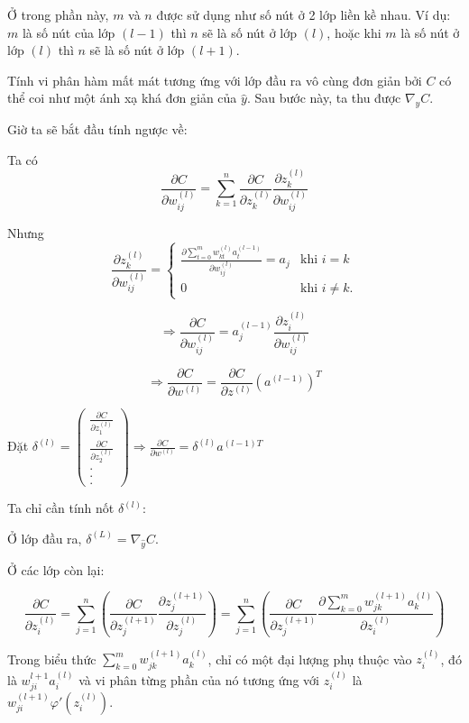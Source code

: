 \documentclass{article}
\begin{document}
Ở trong phần này, $m$ và $n$ được sử dụng như số nút ở 2 lớp liền kề nhau. Ví dụ: $m$ là số nút của lớp $(l - 1)$ thì $n$ sẽ là số nút ở lớp $(l)$, hoặc khi $m$ là số nút ở lớp $(l)$ thì $n$ sẽ là số nút ở lớp $(l + 1)$.

Tính vi phân hàm mất mát tương ứng với lớp đầu ra vô cùng đơn giản bởi $C$ có thể coi như một ánh xạ khá đơn giản của $\hat{y}$. Sau bước này, ta thu được $\nabla_{\hat{y}} C$.

Giờ ta sẽ bắt đầu tính ngược về:

Ta có 
\[\frac{\partial{C}}{\partial{w_{ij}^{(l)}}} = \sum_{k=1}^{n}\frac{\partial{C}}{\partial{z^{(l)}_{k}}} \frac{\partial{z^{(l)}_{k}}}{\partial{w_{ij}^{(l)}}}\]

Nhưng 
\[\frac{\partial{z^{(l)}_{k}}}{\partial{w_{ij}^{(l)}}} =
\begin{cases}
\frac{\partial{\sum_{t=0}^{m}w_{kt}^{(l)}a^{(l-1)}_{t}}}{\partial{w_{ij}^{(l)}}} = a_{j} & \text{khi } i = k \\ 0 & \text{khi } i \neq k.
\end{cases}
\]

\[\Rightarrow \frac{\partial{C}}{\partial{w_{ij}^{(l)}}} = a_{j}^{(l-1)} \frac{\partial{z^{(l)}_{i}}}{\partial{w_{ij}^{(l)}}}\]

\[\Rightarrow \frac{\partial{C}}{\partial{w^{(l)}}} = \frac{\partial{C}}{\partial{z^{(l)}}}(a^{(l-1)})^T\]

Đặt $\delta^{(l)} = \begin{pmatrix} \frac{\partial{C}}{\partial{z^{(l)}_{1}}}\\\frac{\partial{C}}{\partial{z^{(l)}_{2}}}\\.\\.\\. \end{pmatrix} \Rightarrow \frac{\partial{C}}{\partial{w^{(l)}}} = \delta^{(l)} a^{(l-1)T}$

Ta chỉ cần tính nốt $\delta^{(l)}$:

Ở lớp đầu ra, $\delta^{(L)} = \nabla_{\hat{y}} C$.

Ở các lớp còn lại:

\[\frac{\partial{C}}{\partial{z^{(l)}_{i}}} = \sum_{j=1}^{n}(\frac{\partial{C}}{\partial{z^{(l+1)}_{j}}}\frac{\partial{z^{(l+1)}_{j}}}{{\partial{z^{(l)}_{j}}}}) = \sum_{j=1}^{n}(\frac{\partial{C}}{\partial{z^{(l+1)}_{j}}}\frac{\partial{\sum_{k=0}^{m}w_{jk}^{(l+1)}a_{k}^{(l)}}}{\partial{z_{i}^{(l)}}})\]

Trong biểu thức $\sum_{k=0}^{m}w_{jk}^{(l+1)}a_{k}^{(l)}$, chỉ có một đại lượng phụ thuộc vào $z_{i}^{(l)}$, đó là $w_{ji}^{l+1}a_{i}^{(l)}$ và vi phân từng phần của nó tương ứng với $z_{i}^{(l)}$ là $w_{ji}^{(l+1)}\varphi'{(z_{i}^{(l)})}$.
\end{document}
